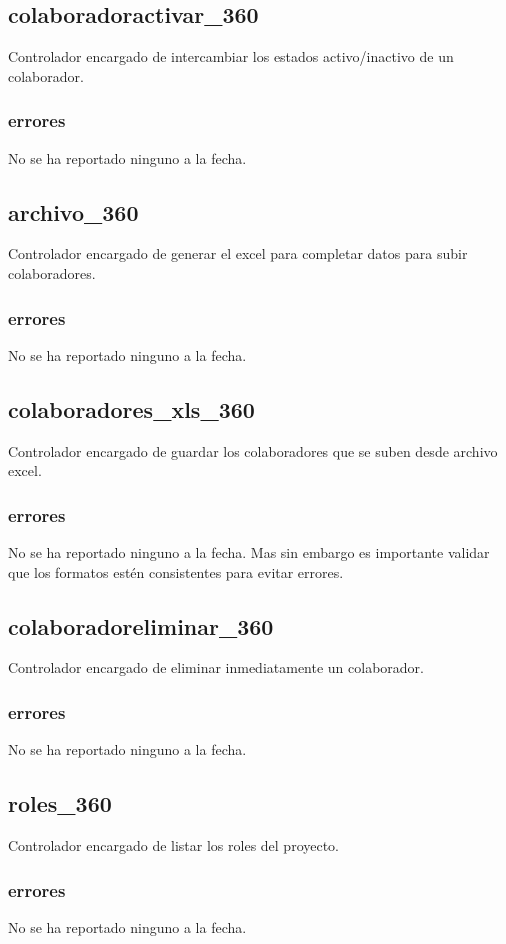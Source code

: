 \documentclass[10pt,a4paper]{book}
\begin{document}
	\subsection{colaboradoractivar\_360}
	Controlador encargado de intercambiar los estados activo/inactivo de un colaborador.
	\subsubsection{errores}
	No se ha reportado ninguno a la fecha.

	\subsection{archivo\_360}
	Controlador encargado de generar el excel para completar datos para subir colaboradores.
	\subsubsection{errores}
	No se ha reportado ninguno a la fecha.

	\subsection{colaboradores\_xls\_360}
	Controlador encargado de guardar los colaboradores que se suben desde archivo excel.
	\subsubsection{errores}
	No se ha reportado ninguno a la fecha. Mas sin embargo es importante validar que los formatos estén consistentes para evitar errores.

	\subsection{colaboradoreliminar\_360}
	Controlador encargado de eliminar inmediatamente un colaborador.
	\subsubsection{errores}
	No se ha reportado ninguno a la fecha.

	\subsection{roles\_360}
	Controlador encargado de listar los roles del proyecto.
	\subsubsection{errores}
	No se ha reportado ninguno a la fecha.
\end{document}
